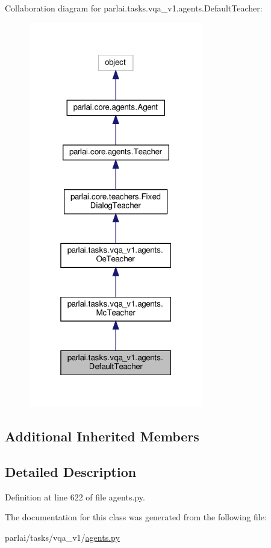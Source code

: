 Collaboration diagram for parlai.\+tasks.\+vqa\+\_\+v1.\+agents.\+Default\+Teacher\+:
\nopagebreak
\begin{figure}[H]
\begin{center}
\leavevmode
\includegraphics[width=217pt]{d2/df7/classparlai_1_1tasks_1_1vqa__v1_1_1agents_1_1DefaultTeacher__coll__graph}
\end{center}
\end{figure}
\subsection*{Additional Inherited Members}


\subsection{Detailed Description}


Definition at line 622 of file agents.\+py.



The documentation for this class was generated from the following file\+:\begin{DoxyCompactItemize}
\item 
parlai/tasks/vqa\+\_\+v1/\hyperlink{parlai_2tasks_2vqa__v1_2agents_8py}{agents.\+py}\end{DoxyCompactItemize}
